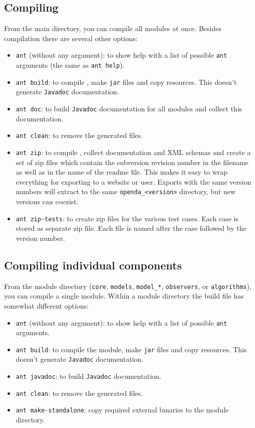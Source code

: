 \subsection{Compiling \oda}
From the \oda main directory, you can compile all modules at once. Besides compilation there are several other options:
\begin{itemize}
\item \verb|ant| (without any argument): to show help with a list of possible \verb|ant| arguments (the same as \verb|ant help|).
\item \verb|ant build|: to compile \oda, make \verb|jar| files and copy resources. This doesn't generate \verb|Javadoc| documentation.
\item \verb|ant doc|: to build \verb|Javadoc| documentation for all modules and collect this documentation.
\item \verb|ant clean|: to remove the generated files.
\item \verb|ant zip|: to compile \oda, collect documentation and XML schemas and create a set of zip files which contain the subversion revision number in the filename as well as in the name of the readme file. This makes it easy to wrap everything for exporting to a website or user. Exports with the same version numbers will extract to the same \verb|openda_<version>| directory, but new versions can coexist.
\item \verb|ant zip-tests|: to create zip files for the various test cases. Each case is stored as separate zip file. Each file is named after the case followed by the version number.
\end{itemize}

\subsection{Compiling individual components}
From the module directory (\verb|core|, \verb|models|, \verb|model_*|, \verb|observers|, or \verb|algorithms|), you can compile a single module. Within a module directory the build file has somewhat different options:

\begin{itemize}
\item \verb|ant| (without any argument): to show help with a list of possible \verb|ant| arguments.
\item \verb|ant build|: to compile the module, make \verb|jar| files and copy resources. This doesn't generate \verb|Javadoc| documentation.
\item \verb|ant javadoc|: to build \verb|Javadoc| documentation.
\item \verb|ant clean|: to remove the generated files.
\item \verb|ant make-standalone|: copy required external binaries to the module directory.
\end{itemize}

